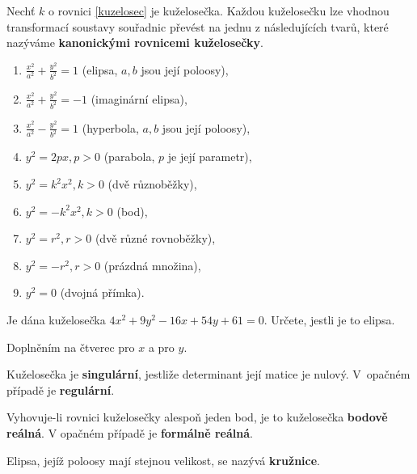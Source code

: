 \begin{definition}
    Nechť $k$ o rovnici \ref{kuzelosec} je kuželosečka. Každou kuželosečku lze
    vhodnou transformací soustavy souřadnic převést na jednu z následujících
    tvarů, které nazýváme \textbf{kanonickými rovnicemi kuželosečky}.
    \begin{enumerate}[$i.$]
    \item $\frac{x^2}{a^2} + \frac{y^2}{b^2}=1$ (elipsa, $a,b$ jsou její poloosy),
   	\item $\frac{x^2}{a^2} + \frac{y^2}{b^2}=-1$ (imaginární elipsa),
   	\item $\frac{x^2}{a^2} - \frac{y^2}{b^2}=1$ (hyperbola, $a,b$ jsou její poloosy),
   	\item $y^2=2px, p>0$ (parabola, $p$ je její parametr),
   	\item $y^2 = k^2x^2, k>0$ (dvě různoběžky),
   	\item $y^2 = -k^2x^2, k>0$ (bod),
   	\item $y^2 = r^2, r>0$ (dvě různé rovnoběžky),
   	\item $y^2 = -r^2, r>0$ (prázdná množina),
   	\item $y^2=0$ (dvojná přímka).
    \end{enumerate}
\end{definition}

\begin{priklad}
Je dána kuželosečka $4x^2+9y^2-16x+54y+61=0.$ Určete, jestli je to elipsa.
\end{priklad}

\begin{reseni}
Doplněním na čtverec pro $x$ a pro $y$.
\end{reseni}

\begin{definition}
    Kuželosečka je \textbf{singulární}, jestliže determinant její matice je nulový.
    V~opačném případě je \textbf{regulární}.
\end{definition}

\begin{definition}
    Vyhovuje-li rovnici kuželosečky alespoň jeden bod, je to kuželosečka
    \textbf{bodově reálná}. V opačném případě je \textbf{formálně reálná}.
\end{definition}

\begin{definition}
    Elipsa, jejíž poloosy mají stejnou velikost, se nazývá \textbf{kružnice}.
\end{definition}

